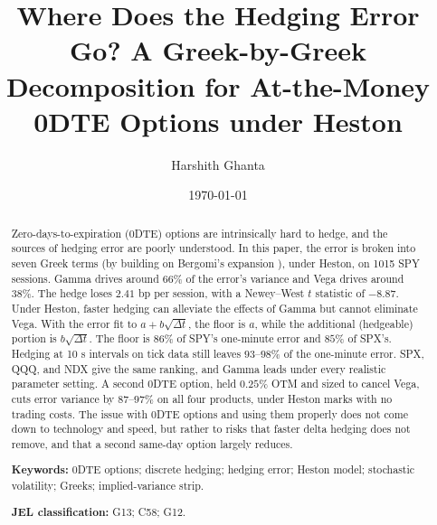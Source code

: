 \documentclass[11pt]{article}
\title{Where Does the Hedging Error Go? A Greek-by-Greek Decomposition for At-the-Money 0DTE Options under Heston}
\author{Harshith Ghanta}
\date{\today}
\begin{document}
 \maketitle \thispagestyle{empty} \newpage

\begin{abstract}

Zero-days-to-expiration (0DTE) options are intrinsically hard to hedge, and the sources of hedging error are poorly understood. In this paper, the error is broken into seven Greek terms (by building on Bergomi's expansion \cite{bergomi2016}), under Heston, on 1015 SPY sessions. Gamma drives around $66\%$ of the error's variance and Vega drives around $38\%$. The hedge loses $2.41$ bp per session, with a Newey--West $t$ statistic of $-8.87$. Under Heston, faster hedging can alleviate the effects of Gamma but cannot eliminate Vega. With the error fit to $a + b\sqrt{\Delta t}$, the floor is $a$, while the additional (hedgeable) portion is $b\sqrt{\Delta t}$. The floor is $86\%$ of SPY's one-minute error and $85\%$ of SPX's. Hedging at 10 s intervals on tick data still leaves $93$--$98\%$ of the one-minute error. SPX, QQQ, and NDX give the same ranking, and Gamma leads under every realistic parameter setting. A second 0DTE option, held $0.25\%$ OTM and sized to cancel Vega, cuts error variance by $87$--$97\%$ on all four products, under Heston marks with no trading costs. The issue with 0DTE options and using them properly does not come down to technology and speed, but rather to risks that faster delta hedging does not remove, and that a second same-day option largely reduces.

\medskip
\noindent\textbf{Keywords:} 0DTE options; discrete hedging; hedging error; Heston model; stochastic volatility; Greeks; implied-variance strip.

\noindent\textbf{JEL classification:} G13; C58; G12.

\thispagestyle{empty}\end{abstract} \newpage {}



\newpage
\end{document}
